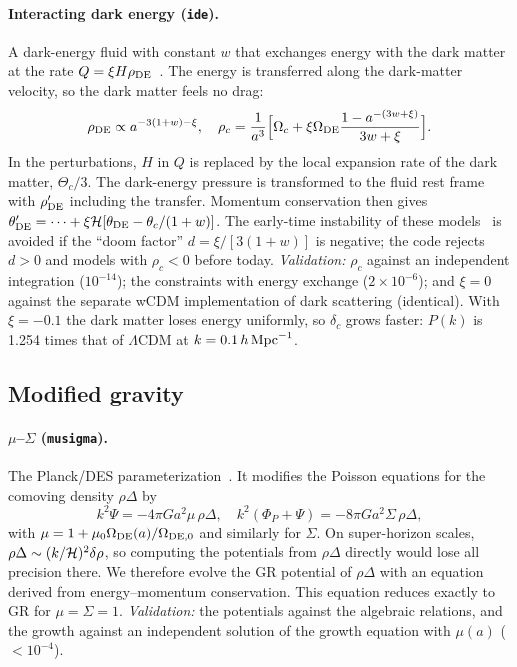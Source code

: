 \paragraph*{Interacting dark energy (\texttt{ide}).} A dark-energy fluid with constant $w$ that exchanges energy
with the dark matter at the rate $Q=\xi H\rho_{\rm DE}$~\cite{Valiviita2008,Gavela2009}. The energy is transferred
along the dark-matter velocity, so the dark matter feels no drag:
\begin{equation}
\rho_{\rm DE}\propto a^{-3(1+w)-\xi},\quad
\rho_c=\frac{1}{a^3}\Big[\Omega_c+\xi\Omega_{\rm DE}\frac{1-a^{-(3w+\xi)}}{3w+\xi}\Big].
\end{equation}
In the perturbations, $H$ in $Q$ is replaced by the local expansion rate of the dark matter, $\Theta_c/3$. The
dark-energy pressure is transformed to the fluid rest frame with $\rho_{\rm DE}'$ including the transfer.
Momentum conservation then gives
$\theta_{\rm DE}'=\dots+\xi\mathcal{H}[\theta_{\rm DE}-\theta_c/(1+w)]$. The early-time instability of these
models~\cite{Valiviita2008} is avoided if the ``doom factor'' $d=\xi/[3(1+w)]$ is negative; the code rejects
$d>0$ and models with $\rho_c<0$ before today. \emph{Validation:} $\rho_c$ against an independent integration
($10^{-14}$); the constraints with energy exchange ($2\times10^{-6}$); and $\xi=0$ against the separate wCDM
implementation of dark scattering (identical). With $\xi=-0.1$ the dark matter loses energy uniformly, so
$\delta_c$ grows faster: $P(k)$ is 1.254 times that of $\Lambda$CDM at $k=0.1\,h\,\mathrm{Mpc}^{-1}$.

\subsection{Modified gravity}

\paragraph*{$\mu$--$\Sigma$ (\texttt{musigma}).} The Planck/DES
parameterization~\cite{Planck2018MG,DES2019MG}. It modifies the Poisson equations for the comoving density
$\rho\Delta$ by
\begin{equation}
k^2\Psi=-4\pi Ga^2\mu\,\rho\Delta,\quad k^2(\Phi_P+\Psi)=-8\pi Ga^2\Sigma\,\rho\Delta,
\end{equation}
with $\mu=1+\mu_0\Omega_{\rm DE}(a)/\Omega_{\rm DE,0}$ and similarly for $\Sigma$. On super-horizon scales,
$\rho\Delta\sim(k/\mathcal{H})^2\delta\rho$, so computing the potentials from $\rho\Delta$ directly would lose all precision
there. We therefore evolve the GR potential of $\rho\Delta$ with an equation derived from energy--momentum
conservation. This equation reduces exactly to GR for $\mu=\Sigma=1$. \emph{Validation:} the potentials against the
algebraic relations, and the growth against an independent solution of the growth equation with $\mu(a)$
($<10^{-4}$).

